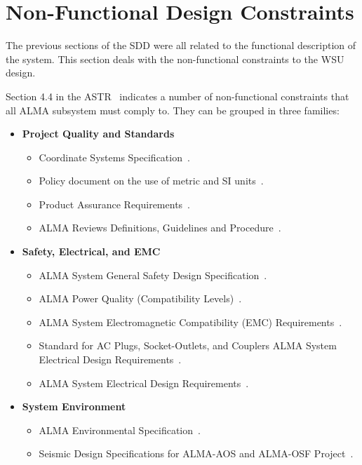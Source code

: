 \section{Non-Functional Design Constraints}
\label{sec:nf_design_constraints}

The previous sections of the \ac{SDD} were all related to the functional description of the system. This section deals with the non-functional constraints to the \ac{WSU} design.

Section 4.4 in the \ac{ASTR}~\cite{sys_reqs} indicates a number of non-functional constraints that all ALMA subsystem must comply to. They can be grouped in three families:

\begin{itemize}[itemsep=-0.5em]
    \item \textbf{Project Quality and Standards}
    \begin{itemize}[itemsep=-0.5em]
        \item Coordinate Systems Specification~\cite{coord_sys_spec}.
        \item Policy document on the use of metric and SI units~\cite{si_units_policy}.
        \item Product Assurance Requirements~\cite{pa_req}.
        \item ALMA Reviews Definitions, Guidelines and Procedure~\cite{ALMA_Reviews_Definitions}.
    \end{itemize}
    
    \item \textbf{Safety, Electrical, and EMC}
    \begin{itemize}[itemsep=-0.5em]
        \item ALMA System General Safety Design Specification~\cite{safety_design_spec}.
        \item ALMA Power Quality (Compatibility Levels)~\cite{power_quality_spec}.
        \item ALMA System Electromagnetic Compatibility (EMC) Requirements~\cite{sys_emc_reqs}.
        \item Standard for AC Plugs, Socket-Outlets, and Couplers ALMA System Electrical Design Requirements~\cite{ac_plugs_standards}.
        \item ALMA System Electrical Design Requirements~\cite{sys_elec_design_reqs}.
    \end{itemize}
    
    \item \textbf{System Environment}
    \begin{itemize}[itemsep=-0.5em]
        \item ALMA Environmental Specification~\cite{environ_spec}.
        \item Seismic Design Specifications for ALMA-AOS and ALMA-OSF Project~\cite{Seismic_Design_Specifications}.
    \end{itemize}
    

\end{itemize}
